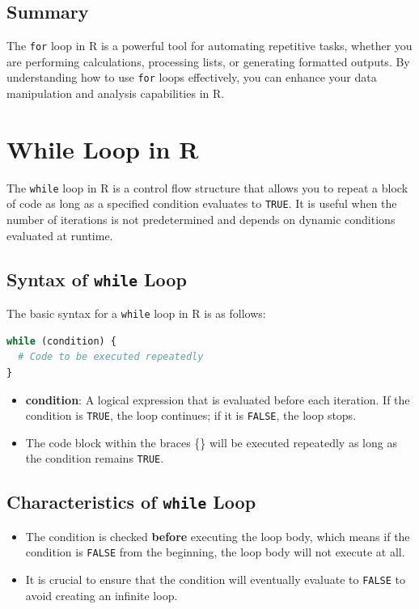 \documentclass[10pt]{book}
\begin{document}
\subsection{Summary}

The \texttt{for} loop in R is a powerful tool for automating repetitive tasks, whether you are performing calculations, processing lists, or generating formatted outputs. By understanding how to use \texttt{for} loops effectively, you can enhance your data manipulation and analysis capabilities in R.

\section{While Loop in R}

The \texttt{while} loop in R is a control flow structure that allows you to repeat a block of code as long as a specified condition evaluates to \texttt{TRUE}. It is useful when the number of iterations is not predetermined and depends on dynamic conditions evaluated at runtime.

\subsection{Syntax of \texttt{while} Loop}

The basic syntax for a \texttt{while} loop in R is as follows:

\begin{lstlisting}[language=R]
while (condition) {
  # Code to be executed repeatedly
}
\end{lstlisting}

\begin{itemize}
    \item \textbf{condition}: A logical expression that is evaluated before each iteration. If the condition is \texttt{TRUE}, the loop continues; if it is \texttt{FALSE}, the loop stops.
    \item The code block within the braces \{\} will be executed repeatedly as long as the condition remains \texttt{TRUE}.
\end{itemize}

\subsection{Characteristics of \texttt{while} Loop}

\begin{itemize}
    \item The condition is checked \textbf{before} executing the loop body, which means if the condition is \texttt{FALSE} from the beginning, the loop body will not execute at all.
    \item It is crucial to ensure that the condition will eventually evaluate to \texttt{FALSE} to avoid creating an infinite loop.
\end{itemize}
\end{document}
